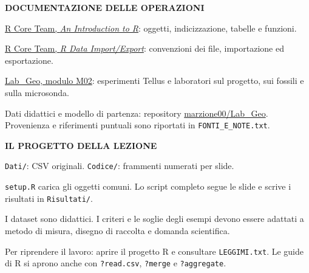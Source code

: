 \documentclass[12pt,aspectratio=1610]{beamer}
\newcommand{\PLabel}[1]{\par{\color{Classical}\bfseries\fontsize{9}{11}\selectfont\MakeUppercase{#1}}\par\vspace{1.8mm}}
\newcommand{\PBody}[1]{\par{\fontsize{11.3}{14.8}\selectfont #1\par}}
\newcommand{\PSmall}[1]{\par{\fontsize{9.8}{13.1}\selectfont #1\par}}
\newcommand{\PInfo}[1]{%
\begin{tcolorbox}[enhanced,arc=1.6mm,boxrule=.55pt,colback=GeoTint,
 colframe=Rule!80!Classical,left=2.3mm,right=2.3mm,top=2mm,bottom=2mm,
 before skip=1mm,after skip=1mm]
\PSmall{#1}\end{tcolorbox}}
\begin{document}
\begin{lrbox}{\PilotLeftBox}%
\begin{minipage}[t]{10.05cm}\raggedright\color{Ink}\fontsize{11.3}{14.8}\selectfont

\PLabel{Documentazione delle operazioni}
\PBody{\href{https://cran.r-project.org/doc/manuals/r-release/R-intro.html}{R Core Team, \textit{An Introduction to R}}: oggetti, indicizzazione, tabelle e funzioni.}
\vspace{3mm}
\PBody{\href{https://cran.r-project.org/doc/manuals/r-release/R-data.html}{R Core Team, \textit{R Data Import/Export}}: convenzioni dei file, importazione ed esportazione.}
\vspace{3mm}
\PBody{\href{https://marzione00.github.io/Lab_Geo/\#modulo-M02}{Lab\_Geo, modulo M02}: esperimenti Tellus e laboratori sul progetto, sui fossili e sulla microsonda.}
\vspace{3mm}
\PSmall{Dati didattici e modello di partenza: repository \href{https://github.com/marzione00/Lab_Geo/tree/main/moduli/M02}{marzione00/Lab\_Geo}. Provenienza e riferimenti puntuali sono riportati in \texttt{FONTI\_E\_NOTE.txt}.}

\end{minipage}%
\end{lrbox}
\begin{lrbox}{\PilotRightBox}%
\begin{minipage}[t]{7.55cm}\raggedright\color{Ink}\fontsize{11.3}{14.8}\selectfont

\PLabel{Il progetto della lezione}
\PBody{\texttt{Dati/}: CSV originali. \texttt{Codice/}: frammenti numerati per slide.}
\vspace{3mm}
\PBody{\texttt{setup.R} carica gli oggetti comuni. Lo script completo segue le slide e scrive i risultati in \texttt{Risultati/}.}
\vspace{3mm}
\PInfo{I dataset sono didattici. I criteri e le soglie degli esempi devono essere adattati a metodo di misura, disegno di raccolta e domanda scientifica.}
\PSmall{Per riprendere il lavoro: aprire il progetto R e consultare \texttt{LEGGIMI.txt}. Le guide di R si aprono anche con \texttt{?read.csv}, \texttt{?merge} e \texttt{?aggregate}.}

\end{minipage}%
\end{lrbox}
\end{document}
